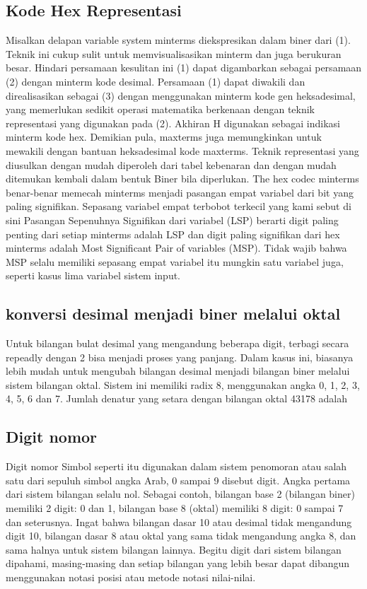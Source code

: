 \subsection{Kode Hex Representasi}
Misalkan delapan variable system minterms diekspresikan dalam biner dari (1).
Teknik ini cukup sulit untuk memvisualisasikan minterm dan juga berukuran besar. 
Hindari persamaan kesulitan ini (1) dapat digambarkan sebagai persamaan (2) dengan minterm kode desimal.
Persamaan (1) dapat diwakili dan direalisasikan sebagai 
(3) dengan menggunakan minterm kode gen heksadesimal, yang memerlukan sedikit operasi matematika berkenaan dengan teknik representasi yang digunakan pada (2).
Akhiran H digunakan sebagai indikasi minterm kode hex.
Demikian pula, maxterms juga memungkinkan untuk mewakili dengan bantuan heksadesimal kode maxterms. Teknik representasi yang diusulkan dengan mudah diperoleh dari tabel kebenaran dan dengan mudah ditemukan kembali dalam bentuk Biner bila diperlukan.
The hex codec minterms benar-benar memecah minterms menjadi pasangan empat variabel dari bit yang paling signifikan. 
Sepasang variabel empat terbobot terkecil yang kami sebut di sini Pasangan Sepenuhnya Signifikan dari variabel (LSP) berarti digit paling penting dari setiap minterms adalah LSP dan digit paling signifikan dari hex minterms adalah Most Significant Pair of variables (MSP). 
Tidak wajib bahwa MSP selalu memiliki sepasang empat variabel itu mungkin satu variabel juga, seperti kasus lima variabel sistem input. 

\subsection{konversi desimal menjadi biner melalui oktal}
Untuk bilangan bulat desimal yang mengandung beberapa digit, terbagi secara repeadly dengan 2 bisa menjadi proses yang panjang. 
Dalam kasus ini, biasanya lebih mudah untuk mengubah bilangan desimal menjadi bilangan biner melalui sistem bilangan oktal. 
Sistem ini memiliki radix 8, menggunakan angka 0, 1, 2, 3, 4, 5, 6 dan 7. 
Jumlah denatur yang setara dengan bilangan oktal 43178 adalah

\subsection{Digit nomor}
Digit nomor
Simbol seperti itu digunakan dalam sistem penomoran atau salah satu dari sepuluh simbol angka Arab, 0 sampai 9 disebut digit. 
Angka pertama dari sistem bilangan selalu nol. 
Sebagai contoh, bilangan base 2 (bilangan biner) memiliki 2 digit: 0 dan 1, bilangan base 8 (oktal) memiliki 8 digit: 0 sampai 7 dan seterusnya. 
Ingat bahwa bilangan dasar 10 atau desimal tidak mengandung digit 10, bilangan dasar 8 atau oktal yang sama tidak mengandung angka 8, dan sama halnya untuk sistem bilangan lainnya. 
Begitu digit dari sistem bilangan dipahami, masing-masing dan setiap bilangan yang lebih besar dapat dibangun menggunakan notasi posisi atau metode notasi nilai-nilai.

